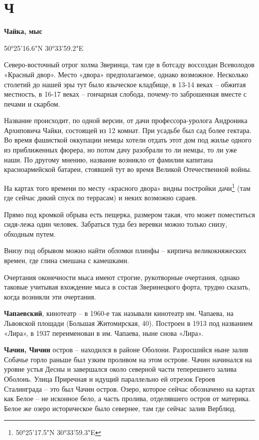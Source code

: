\chapter*{Ч}

\textbf{Чайка, мыс}

50°25'16.6"N 30°33'59.2"E

Северо-восточный отрог холма Зверинца, там где в ботсаду воссоздан Всеволодов «Красный двор». Место «двора» предполагаемое, однако возможное. Несколько столетий до нашей эры тут было языческое кладбище, в 13-14 веках – обжитая местность, в 16-17 веках – гончарная слобода, почему-то заброшенная вместе с печами и скарбом.

Название происходит, по одной версии, от дачи профессора-уролога Андроника Архиповича Чайки, состоящей из 12 комнат. При усадьбе был сад более гектара. Во время фашисткой оккупации немцы хотели отдать этот дом под жилье одного из приближенных фюрера, но потом дачу разобрали то ли немцы, то ли уже наши. По другому мнению, название возникло от фамилии капитана красноармейской батареи, стоявшей тут во время Великой Отечественной войны.

На картах того времени по месту «красного двора» видны постройки дачи\footnote{50°25'17.5"N 30°33'59.3"E} (там где сейчас дикий спуск по террасам) и неких возможно сараев.

Прямо под кромкой обрыва есть пещерка, размером такая, что может поместиться сидя-лежа один человек. Забраться туда без веревки можно только снизу, обходным путем.

Внизу под обрывом можно найти обломки плинфы – кирпича великокняжеских времен, где глина смешана с камешками.

Очертания оконечности мыса имеют строгие, рукотворные очертания, однако таковые учитывая вхождение мыса в состав Зверинецкого форта, трудно сказать, когда возникли эти очертания.\\ 

\medskip

\textbf{Чапаевский}, кинотеатр – в 1960-е так называли кинотеатр им. Чапаева, на Львовской площади (Большая Житомирская, 40). Построен в 1913 под названием «Лира», в 1937 переименован в им. Чапаева, ныне снова «Лира».\\

\medskip

\textbf{Чачин, Чичин} остров – находился в районе Оболони. Разросшийся ныне залив Собачье горло раньше был узким проливом на этом острове. Чачин начинался на уровне устья Десны и завершался около северной части теперешнего залива Оболонь. Улица Приречная и идущий параллельно ей отрезок Героев Сталинграда – это был Чачин остров. Озеро, которое сейчас обозначено на картах как Белое – не исконное бело, а часть пролива, отделявшего остров от материка. Белое же озеро историческое было севернее, там где сейчас залив Верблюд.\\

